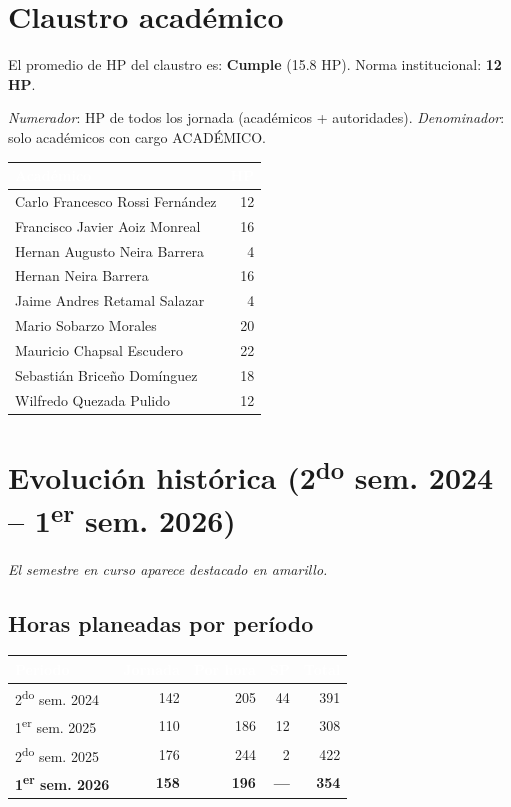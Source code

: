 \documentclass[11pt, a4paper]{article}
\begin{document}
\section{Claustro académico}

El promedio de HP del claustro es: \textcolor{green!60!black}{\textbf{Cumple}} (15.8 HP). Norma institucional: \textbf{12 HP}.

\textit{Numerador}: HP de todos los jornada (académicos + autoridades). \textit{Denominador}: solo académicos con cargo ACADÉMICO.

\begin{tabular}{lr}
\toprule
\rowcolor{usachDark} \textbf{\textcolor{white}{Académico}} & \textbf{\textcolor{white}{HP}} \\
\midrule
Carlo Francesco Rossi Fernández & 12 \\
\rowcolor{rowEven}Francisco Javier Aoiz Monreal & 16 \\
Hernan Augusto Neira Barrera & 4 \\
\rowcolor{rowEven}Hernan Neira Barrera & 16 \\
Jaime Andres Retamal Salazar & 4 \\
\rowcolor{rowEven}Mario Sobarzo Morales & 20 \\
Mauricio Chapsal Escudero & 22 \\
\rowcolor{rowEven}Sebastián Briceño Domínguez & 18 \\
Wilfredo Quezada Pulido & 12 \\
\bottomrule
\end{tabular}

\section{Evolución histórica (2\textsuperscript{do} sem. 2024 -- 1\textsuperscript{er} sem. 2026)}

\textit{El semestre en curso aparece destacado en amarillo.}

\subsection{Horas planeadas por período}

\begin{tabular}{lrrrr}
\toprule
\rowcolor{usachDark} \textbf{\textcolor{white}{Periodo}} & \textbf{\textcolor{white}{Jornada}} & \textbf{\textcolor{white}{Por hora}} & \textbf{\textcolor{white}{SP}} & \textbf{\textcolor{white}{Total}} \\
\midrule
2\textsuperscript{do} sem. 2024 & 142 & 205 & 44 & 391 \\
\rowcolor{rowEven}1\textsuperscript{er} sem. 2025 & 110 & 186 & 12 & 308 \\
2\textsuperscript{do} sem. 2025 & 176 & 244 & 2 & 422 \\
\rowcolor{rowHighlight}\textbf{1\textsuperscript{er} sem. 2026} & \textbf{158} & \textbf{196} & \textbf{---} & \textbf{354} \\
\bottomrule
\end{tabular}
\end{document}
